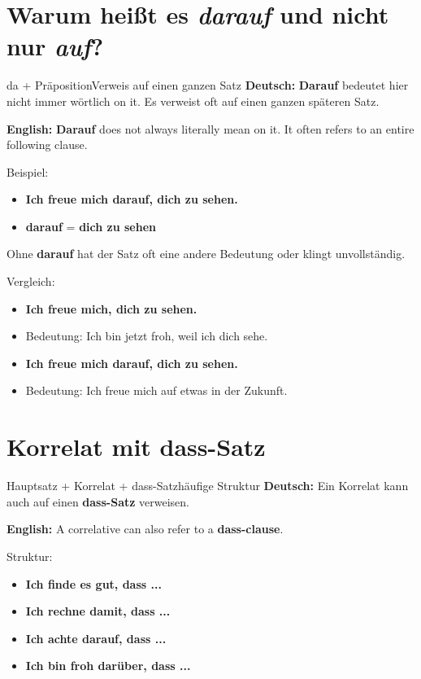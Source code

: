 \documentclass[a4paper,11pt]{article}
\newcommand{\GermanText}[1]{\textbf{Deutsch: }#1\par}
\newcommand{\EnglishText}[1]{{\small\color{SoftGray}\textbf{English: }#1\par}}
\begin{document}
    
    \section{Warum heißt es \textit{darauf} und nicht nur \textit{auf}?}
        
        \begin{grammarentry}{da + Präposition}{Verweis auf einen ganzen Satz}
            \GermanText{\textbf{Darauf} bedeutet hier nicht immer wörtlich on it. Es verweist oft auf einen ganzen späteren Satz.}
            \EnglishText{\textbf{Darauf} does not always literally mean on it. It often refers to an entire following clause.}
            
            Beispiel:
            \begin{itemize}
                \item \textbf{Ich freue mich darauf, dich zu sehen.}
                \item \textbf{darauf} = \textbf{dich zu sehen}
            \end{itemize}
            
            Ohne \textbf{darauf} hat der Satz oft eine andere Bedeutung oder klingt unvollständig.
            
            Vergleich:
            \begin{itemize}
                \item \textbf{Ich freue mich, dich zu sehen.}
                \item Bedeutung: Ich bin jetzt froh, weil ich dich sehe.
                \item \textbf{Ich freue mich darauf, dich zu sehen.}
                \item Bedeutung: Ich freue mich auf etwas in der Zukunft.
            \end{itemize}
        \end{grammarentry}
    
    
    \section{Korrelat mit dass-Satz}
        
        \begin{grammarentry}{Hauptsatz + Korrelat + dass-Satz}{häufige Struktur}
            \GermanText{Ein Korrelat kann auch auf einen \textbf{dass-Satz} verweisen.}
            \EnglishText{A correlative can also refer to a \textbf{dass-clause}.}
            
            Struktur:
            \begin{itemize}
                \item \textbf{Ich finde es gut, dass ...}
                \item \textbf{Ich rechne damit, dass ...}
                \item \textbf{Ich achte darauf, dass ...}
                \item \textbf{Ich bin froh darüber, dass ...}
            \end{itemize}
        \end{grammarentry}
        
\end{document}
